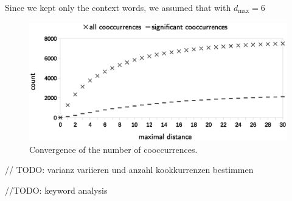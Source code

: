 \documentclass[10pt,a4paper,twocolumn]{scrartcl}
\begin{document}
 Since we kept only the context words, we assumed that with $d_\text{max} = 6$


\begin{figure}
\includegraphics[width=\columnwidth]{figures/distance_eps}
\caption{Convergence of the number of cooccurrences.} \label{fig:distance}
\end{figure}
// TODO: varianz variieren und anzahl kookkurrenzen bestimmen

//TODO: keyword analysis
\end{document}

